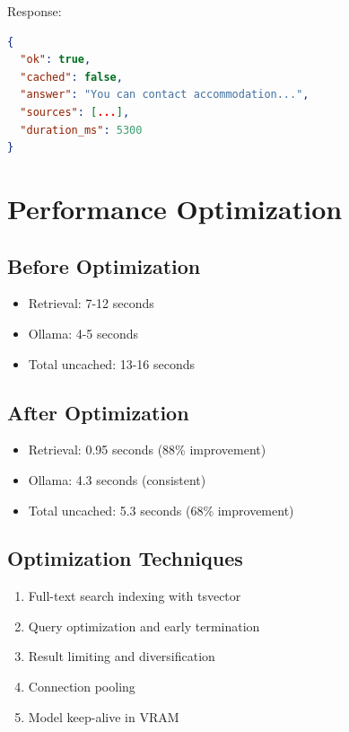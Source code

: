 \documentclass[12pt]{article}
\begin{document}
Response:
\begin{lstlisting}[language=json]
{
  "ok": true,
  "cached": false,
  "answer": "You can contact accommodation...",
  "sources": [...],
  "duration_ms": 5300
}
\end{lstlisting}

\section{Performance Optimization}

\subsection{Before Optimization}

\begin{itemize}
    \item Retrieval: 7-12 seconds
    \item Ollama: 4-5 seconds
    \item Total uncached: 13-16 seconds
\end{itemize}

\subsection{After Optimization}

\begin{itemize}
    \item Retrieval: 0.95 seconds (88\% improvement)
    \item Ollama: 4.3 seconds (consistent)
    \item Total uncached: 5.3 seconds (68\% improvement)
\end{itemize}

\subsection{Optimization Techniques}

\begin{enumerate}
    \item Full-text search indexing with tsvector
    \item Query optimization and early termination
    \item Result limiting and diversification
    \item Connection pooling
    \item Model keep-alive in VRAM
\end{enumerate}
\end{document}
